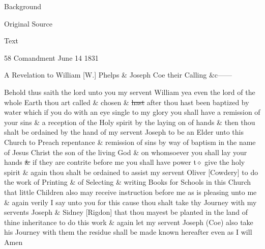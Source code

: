 			\begin{description}
				\item[Background]
			\end{description}
			
			
			\begin{description}
				\item[Original Source]
			\end{description}
			
			
			\begin{description}
				\item[Text]
			\end{description}
			
				\begin{tightcenter}
				58 Comandment June 14 1831
				\end{tightcenter}
				
				A Revelation to William [W.] Phelps \& Joseph Coe their Calling \&c------
				
				Behold thus saith the lord unto you my servent William yea even the lord of the whole Earth thou art called \& chosen \& \sout{hast} after thou hast been baptized by water which if you do with an eye single to my glory you shall have a remission of your sins \& a reception of the Holy spirit by the laying on of hands \& then thou shalt be ordained by the hand of my servent Joseph to be an Elder unto this Church to Preach repentance \& remission of sins by way of baptism in the name of Jesus Christ the son of the living God \& on whomsoever you shall lay your hands \sout{\&} if they are contrite before me you shall have power t$\diamond$ give the holy spirit \& again thou shalt be ordained to assist my servent Oliver [Cowdery] to do the work of Printing \& of Selecting \& writing Books for Schools in this Church that little Children also may receive instruction before me as is pleasing unto me \& again verily I say unto you for this cause thou shalt take thy Journey with my servents Joseph \& Sidney [Rigdon] that thou mayest be planted in the land of thine inheritance to do this work \& again let my servent Joseph (Coe) also take his Journey with them the residue shall be made known hereafter even as I will Amen
				
